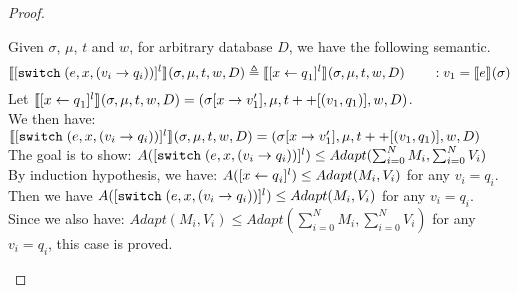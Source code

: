 \documentclass[a4paper,11pt]{article}
\begin{document}
\begin{proof}
\begin{itemize}
%
%
%
%
Given $\sigma$, $\mu$, $t$ and $w$, for arbitrary database $D$, we have the following semantic.
%
%
\[
\llbracket {[\ensuremath{\mathtt{switch}}\;( e, x, (v_i \to  q_i))]^{l}} \rrbracket_{} (\sigma, \mu , t, w , D)  
\triangleq 
\llbracket [\mathrel{ x \leftarrow q }_1]^{l} \rrbracket_{} ( \sigma, \mu , t, w, D ) 
\qquad : v_1 = \llbracket e\rrbracket_{}{(\sigma)}
\]
%
Let $\llbracket[\mathrel{ x \leftarrow q }_1]^{l}\rrbracket_{} (\sigma , \mu, t, w, D) = (\sigma[x \to v_1'] , \mu, t++[(v_1, q_1)], w, D)$.
\\
We then have:
$\llbracket {[\ensuremath{\mathtt{switch}}\;( e, x, (v_i \to  q_i))]^{l}} \rrbracket_{} (\sigma, \mu , t, w , D)  
=(\sigma[x \to v_1'] , \mu, t++[(v_1, q_1)], w, D)
$
\\
The goal is to show:
$A( {[\mathtt{switch}\;( e, x, (v_i \to  q_i))]^{l}}) \leq Adapt(\sum_{i = 0}^{N}M_i, \sum_{i = 0}^{N}V_i)$
\\
By induction hypothesis, we have:
%
$A([\mathrel{ x \leftarrow q }_i]^{l})  \leq Adapt(M_i, V_i)$ for any $v_i = q_i$.
%
\\
Then we have $A( {[\mathtt{switch}\;( e, x, (v_i \to  q_i))]^{l}}) \leq Adapt(M_i, V_i)$ for any $v_i = q_i$.
\\
%
Since we also have: $ Adapt(M_i, V_i) \leq Adapt(\sum_{i = 0}^{N}M_i, \sum_{i = 0}^{N}V_i)$ for any $v_i = q_i$, this case is proved.
%
%

\end{itemize}
\end{proof}
\end{document}
